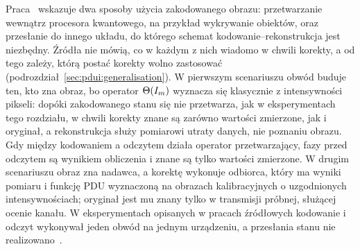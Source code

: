 Praca~\cite{werner_error_reduction_2025} wskazuje dwa sposoby użycia zakodowanego obrazu: przetwarzanie wewnątrz procesora kwantowego, na przykład wykrywanie obiektów, oraz przesłanie do innego układu, do którego schemat kodowanie--rekonstrukcja jest niezbędny.
Źródła nie mówią, co w każdym z nich wiadomo w chwili korekty, a od tego zależy, którą postać korekty wolno zastosować (podrozdział~\ref{sec:pdui:generalisation}).
W pierwszym scenariuszu obwód buduje ten, kto zna obraz, bo operator $\Theta(I_m)$ wyznacza się klasycznie z intensywności pikseli: dopóki zakodowanego stanu się nie przetwarza, jak w eksperymentach tego rozdziału, w chwili korekty znane są zarówno wartości zmierzone, jak i oryginał, a rekonstrukcja służy pomiarowi utraty danych, nie poznaniu obrazu.
Gdy między kodowaniem a odczytem działa operator przetwarzający, fazy przed odczytem są wynikiem obliczenia i znane są tylko wartości zmierzone.
W drugim scenariuszu obraz zna nadawca, a korektę wykonuje odbiorca, który ma wyniki pomiaru i funkcję PDU wyznaczoną na obrazach kalibracyjnych o uzgodnionych intensywnościach; oryginał jest mu znany tylko w transmisji próbnej, służącej ocenie kanału.
W eksperymentach opisanych w pracach źródłowych kodowanie i odczyt wykonywał jeden obwód na jednym urządzeniu, a przesłania stanu nie realizowano~\cite{werner_data_loss_2023,werner_error_reduction_2025}.

